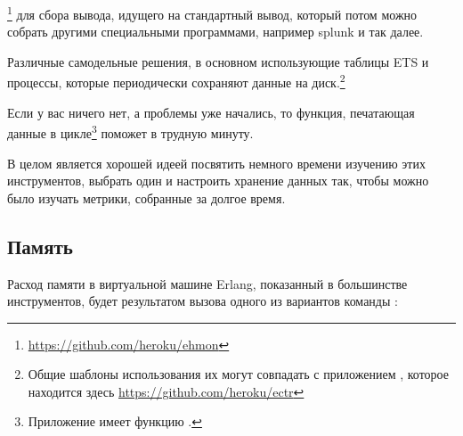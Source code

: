\begin{itemize*}
	\item {}\footnote{\href{https://github.com/heroku/ehmon}{https://github.com/heroku/ehmon}} для сбора вывода, идущего на стандартный вывод, который потом можно собрать другими специальными программами, например splunk и так далее.
	\item Различные самодельные решения, в основном использующие таблицы ETS и процессы, которые периодически сохраняют данные на диск.\footnote{Общие шаблоны использования их могут совпадать с приложением , которое находится здесь \href{https://github.com/heroku/ectr}{https://github.com/heroku/ectr}}
	\item Если у вас ничего нет, а проблемы уже начались, то функция, печатающая данные в цикле\footnote{Приложение  имеет функцию .} поможет в трудную минуту.
\end{itemize*}

В целом является хорошей идеей посвятить немного времени изучению этих инструментов, выбрать один и настроить хранение данных так, чтобы можно было изучать метрики, собранные за долгое время.


\subsection{Память}

Расход памяти в виртуальной машине Erlang, показанный в большинстве инструментов, будет результатом вызова одного из вариантов команды :

